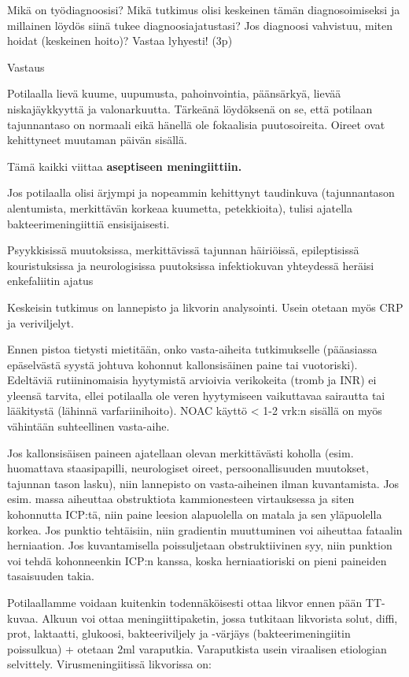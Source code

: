 \documentclass[
]{book}
\begin{document}
Mikä on työdiagnoosisi? Mikä tutkimus olisi keskeinen tämän diagnosoimiseksi ja millainen löydös siinä tukee diagnoosiajatustasi? Jos diagnoosi vahvistuu, miten hoidat (keskeinen hoito)? Vastaa lyhyesti! (3p)

Vastaus

Potilaalla lievä kuume, uupumusta, pahoinvointia, päänsärkyä, lievää niskajäykkyyttä ja valonarkuutta. Tärkeänä löydöksenä on se, että potilaan tajunnantaso on normaali eikä hänellä ole fokaalisia puutosoireita. Oireet ovat kehittyneet muutaman päivän sisällä.

Tämä kaikki viittaa \textbf{aseptiseen meningiittiin.}

Jos potilaalla olisi ärjympi ja nopeammin kehittynyt taudinkuva (tajunnantason alentumista, merkittävän korkeaa kuumetta, petekkioita), tulisi ajatella bakteerimeningiittiä ensisijaisesti.

Psyykkisissä muutoksissa, merkittävissä tajunnan häiriöissä, epileptisissä kouristuksissa ja neurologisissa puutoksissa infektiokuvan yhteydessä heräisi enkefaliitin ajatus

Keskeisin tutkimus on lannepisto ja likvorin analysointi. Usein otetaan myös CRP ja veriviljelyt.

Ennen pistoa tietysti mietitään, onko vasta-aiheita tutkimukselle (pääasiassa epäselvästä syystä johtuva kohonnut kallonsisäinen paine tai vuotoriski). Edeltäviä rutiininomaisia hyytymistä arvioivia verikokeita (tromb ja INR) ei yleensä tarvita, ellei potilaalla ole veren hyytymiseen vaikuttavaa sairautta tai lääkitystä (lähinnä varfariinihoito). NOAC käyttö \textless{} 1-2 vrk:n sisällä on myös vähintään suhteellinen vasta-aihe.

Jos kallonsisäisen paineen ajatellaan olevan merkittävästi koholla (esim. huomattava staasipapilli, neurologiset oireet, persoonallisuuden muutokset, tajunnan tason lasku), niin lannepisto on vasta-aiheinen ilman kuvantamista. Jos esim. massa aiheuttaa obstruktiota kammionesteen virtauksessa ja siten kohonnutta ICP:tä, niin paine leesion alapuolella on matala ja sen yläpuolella korkea. Jos punktio tehtäisiin, niin gradientin muuttuminen voi aiheuttaa fataalin herniaation. Jos kuvantamisella poissuljetaan obstruktiivinen syy, niin punktion voi tehdä kohonneenkin ICP:n kanssa, koska herniaatioriski on pieni paineiden tasaisuuden takia.

Potilaallamme voidaan kuitenkin todennäköisesti ottaa likvor ennen pään TT-kuvaa. Alkuun voi ottaa meningiittipaketin, jossa tutkitaan likvorista solut, diffi, prot, laktaatti, glukoosi, bakteeriviljely ja -värjäys (bakteerimeningiitin poissulkua) + otetaan 2ml varaputkia. Varaputkista usein viraalisen etiologian selvittely. Virusmeningiitissä likvorissa on:
\end{document}
